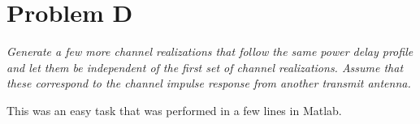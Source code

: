 \section{Problem D}
\textit{Generate a few more channel realizations that follow the same power delay profile and let them be independent of the first set of channel realizations. Assume that these correspond to the channel impulse response from another transmit antenna.}

This was an easy task that was performed in a few lines in Matlab.

